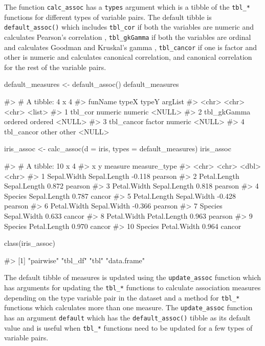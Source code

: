 The function \texttt{calc\_assoc} has a \texttt{types} argument which is
a tibble of the \texttt{tbl\_*} functions for different types of
variable pairs. The default tibble is \texttt{default\_assoc()} which
includes \texttt{tbl\_cor} if both the variables are numeric and
calculates Pearson's correlation , \texttt{tbl\_gkGamma} if both the
variables are ordinal and calculates Goodman and Kruskal's gamma ,
\texttt{tbl\_cancor} if one is factor and other is numeric and
calculates canonical correlation, and canonical correlation for the rest
of the variable pairs.

\begin{Schunk}
\begin{Sinput}
default_measures <- default_assoc()
default_measures
\end{Sinput}
\begin{Soutput}
#> # A tibble: 4 x 4
#>   funName     typeX   typeY   argList
#>   <chr>       <chr>   <chr>   <list> 
#> 1 tbl_cor     numeric numeric <NULL> 
#> 2 tbl_gkGamma ordered ordered <NULL> 
#> 3 tbl_cancor  factor  numeric <NULL> 
#> 4 tbl_cancor  other   other   <NULL>
\end{Soutput}
\begin{Sinput}
iris_assoc <- calc_assoc(d = iris,
                         types = default_measures)
iris_assoc
\end{Sinput}
\begin{Soutput}
#> # A tibble: 10 x 4
#>    x            y            measure measure_type
#>    <chr>        <chr>          <dbl> <chr>       
#>  1 Sepal.Width  Sepal.Length  -0.118 pearson     
#>  2 Petal.Length Sepal.Length   0.872 pearson     
#>  3 Petal.Width  Sepal.Length   0.818 pearson     
#>  4 Species      Sepal.Length   0.787 cancor      
#>  5 Petal.Length Sepal.Width   -0.428 pearson     
#>  6 Petal.Width  Sepal.Width   -0.366 pearson     
#>  7 Species      Sepal.Width    0.633 cancor      
#>  8 Petal.Width  Petal.Length   0.963 pearson     
#>  9 Species      Petal.Length   0.970 cancor      
#> 10 Species      Petal.Width    0.964 cancor
\end{Soutput}
\begin{Sinput}
class(iris_assoc)
\end{Sinput}
\begin{Soutput}
#> [1] "pairwise"   "tbl_df"     "tbl"        "data.frame"
\end{Soutput}
\end{Schunk}

The default tibble of measures is updated using the
\texttt{update\_assoc} function which has arguments for updating the
\texttt{tbl\_*} functions to calculate association measures depending on
the type variable pair in the dataset and a method for \texttt{tbl\_*}
functions which calculates more than one measure. The
\texttt{update\_assoc} function has an argument \texttt{default} which
has the \texttt{default\_assoc()} tibble as its default value and is
useful when \texttt{tbl\_*} functions need to be updated for a few types
of variable pairs.

